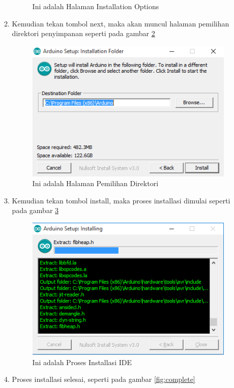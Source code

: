 \begin{enumerate}
\begin{enumerate}
\begin{figure}[!htbp]
                \caption{Ini adalah Halaman Installation Options}\label{fig:option}
                \end{figure}
            \item Kemudian tekan tombol next, maka akan muncul halaman pemilihan direktori penyimpanan seperti pada gambar \ref{fig:dir}
                \begin{figure}[!htbp]
                \centering
                \includegraphics[width=.75\textwidth]{figures/IDE/dir.png}
                \caption{Ini adalah Halaman Pemilihan Direktori}\label{fig:dir}
                \end{figure}
            \item Kemudian tekan tombol install, maka proses installasi dimulai seperti pada gambar \ref{fig:installing}
                \begin{figure}[!htbp]
                \centering
                \includegraphics[width=.75\textwidth]{figures/IDE/installing.png}
                \caption{Ini adalah Proses Installasi IDE}\label{fig:installing}
                \end{figure}
            \item Proses installasi selesai, seperti pada gambar \ref{fig:complete}

\end{enumerate}
\end{enumerate}
